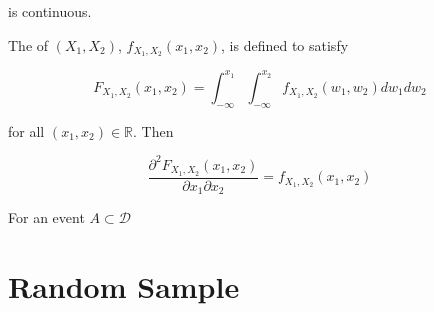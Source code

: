\documentclass{article}
\begin{document}
            is continuous.

            The  of $ (X_{1}, X_{2})
            $, $ f_{X_{1}, X_{2}}(x_{1}, x_{2}) $, is defined to satisfy

            \begin{equation*}
                 F_{X_{1}, X_{2}} (x_{1}, x_{2}) = \int_{-\infty}^{x_{1}}
                     \int_{-\infty}^{x_{2}} f_{X_{1}, X_{2}} (w_{1}, w_{2}) d w_{1} d w_{2}
            \end{equation*}

            for all $ (x_{1}, x_{2}) \in \mathbb{R} $. Then

            \begin{equation*}
                 \frac{\partial^{2} F_{X_{1}, X_{2}} (x_{1}, x_{2})}{\partial
                     x_{1} \partial x_{2}} = f_{X_{1}, X_{2}} (x_{1}, x_{2})
            \end{equation*}

            For an event $ A \subset \mathcal{D} $


    \section*{Random Sample}
\end{document}
